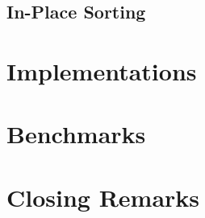 \documentclass{article}
\begin{document}
	\subsection{In-Place Sorting}
	
	\section{Implementations}
	\label{Implementations}
	
	\section{Benchmarks}
	\label{Benchmarks}
	
	\section{Closing Remarks}
	\label{Closing Remarks}
	
\end{document}
